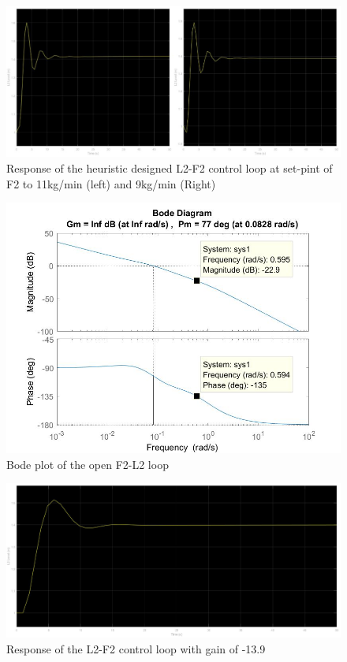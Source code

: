 \documentclass[11pt]{article}
\begin{document}
\begin{figure} [H]
\centering	\includegraphics[scale = 0.6]
{F2_setpoints}
\caption{Response of the heuristic designed L2-F2 control loop at set-pint of F2 to 11kg/min (left) and 9kg/min (Right)}
\label{F2_setpoints}
\end{figure}

\begin{figure} [H]
\centering	\includegraphics[scale = 0.4]
{L2_Open_bode}
\caption{Bode plot of the open F2-L2 loop}
\label{OG_bode}
\end{figure}

\begin{figure} [H]
\centering	\includegraphics[scale = 0.2]
{L2_theory}
\caption{Response of the L2-F2 control loop with gain of -13.9}
\label{L2_theory}
\end{figure}
\end{document}
